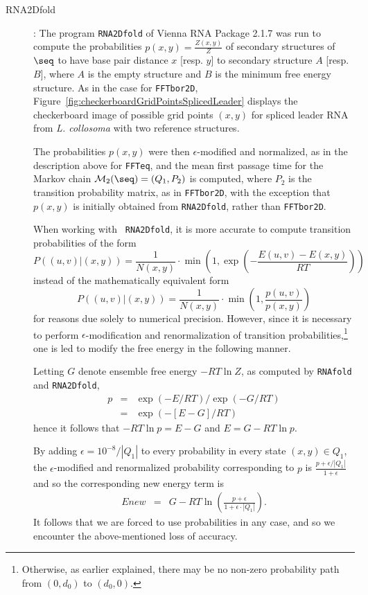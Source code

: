 \begin{description}
\item[RNA2Dfold]: The program {\tt RNA2Dfold} of Vienna RNA Package
2.1.7 was run to compute the probabilities $p(x,y) = \frac{Z(x,y)}{Z}$
of secondary structures of $\seq$ to have base pair distance $x$
[resp. $y$] to secondary structure $A$ [resp. $B$], where $A$ is the
empty structure and $B$ is the minimum free energy structure. As in
the case for {\tt FFTbor2D},
Figure~\ref{fig:checkerboardGridPointsSplicedLeader} displays the
checkerboard image of possible grid points $(x,y)$ for spliced leader
RNA from {\em L. collosoma} with two reference structures.

The probabilities $p(x,y)$ were then $\epsilon$-modified and
normalized, as in the description above for {\tt FFTeq}, and the mean
first passage time for the Markov chain $\mathcal{M}_2(\seq) =
(Q_1,P_2)$ is computed, where $P_2$ is the transition probability
matrix, as in {\tt FFTbor2D}, with the exception that $p(x,y)$ is
initially obtained from {\tt RNA2Dfold}, rather than {\tt FFTbor2D}.

When working with {\tt
RNA2Dfold}, it is more accurate to compute transition probabilities of
the form $$ P( (u,v) | (x,y) ) = \frac{1}{N(x,y)} \cdot \min(1,
\exp(-\frac{E(u,v)-E(x,y)}{RT})) $$ instead of the mathematically
equivalent form $$ P( (u,v) | (x,y) ) = \frac{1}{N(x,y)} \cdot \min(1,
\frac{p(u,v)}{p(x,y)}) $$ for reasons due solely to numerical
precision. However, since it is necessary to perform
$\epsilon$-modification and renormalization of transition
probabilities,\footnote{Otherwise, as earlier explained, there may be
no non-zero probability path from $(0,d_0)$ to $(d_0,0)$.} one is led
to modify the free energy in the following manner.

Letting $G$ denote ensemble free energy $-RT \ln Z$, as computed by
{\tt RNAfold} and {\tt RNA2Dfold},
\begin{eqnarray*}
p &=& \exp(-E/RT)/\exp(-G/RT) \\
&=& \exp(-[ E-G] /RT)
\end{eqnarray*}
hence it follows that $-RT \ln p = E-G$ and $E = G-RT \ln p$.

By adding $\epsilon=10^{-8}/|Q_1|$ to every probability in every state
$(x,y) \in Q_1$, the $\epsilon$-modified and renormalized probability
corresponding to $p$ is $\frac{p+\epsilon/|Q_1|}{1+ \epsilon}$ and so
the corresponding new energy term is
\begin{eqnarray}
\label{eq:modifiedEnergyTerm} Enew &=& G- RT \ln( \frac{p+\epsilon}{1
+ \epsilon \cdot |Q_1|} ).
\end{eqnarray}
It follows that we are forced to use probabilities in any case, and so
we encounter the above-mentioned loss of accuracy.


\end{description}
